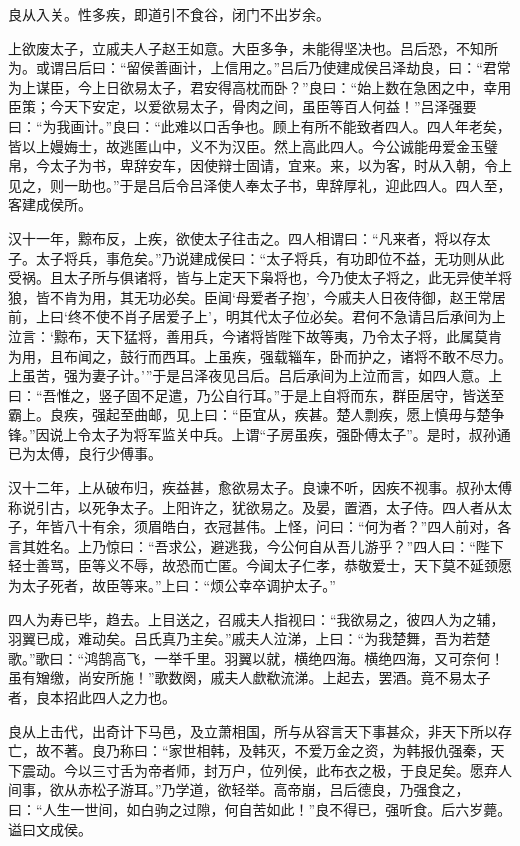 \documentclass[]{article}
\begin{document}
良从入关。性多疾，即道引不食谷，闭门不出岁余。

上欲废太子，立戚夫人子赵王如意。大臣多争，未能得坚决也。吕后恐，不知所为。或谓吕后曰：``留侯善画计，上信用之。''吕后乃使建成侯吕泽劫良，曰：``君常为上谋臣，今上日欲易太子，君安得高枕而卧？''良曰：``始上数在急困之中，幸用臣策；今天下安定，以爱欲易太子，骨肉之间，虽臣等百人何益！''吕泽强要曰：``为我画计。''良曰：``此难以口舌争也。顾上有所不能致者四人。四人年老矣，皆以上嫚娒士，故逃匿山中，义不为汉臣。然上高此四人。今公诚能毋爱金玉璧帛，今太子为书，卑辞安车，因使辩士固请，宜来。来，以为客，时从入朝，令上见之，则一助也。''于是吕后令吕泽使人奉太子书，卑辞厚礼，迎此四人。四人至，客建成侯所。

汉十一年，黥布反，上疾，欲使太子往击之。四人相谓曰：``凡来者，将以存太子。太子将兵，事危矣。''乃说建成侯曰：``太子将兵，有功即位不益，无功则从此受祸。且太子所与俱诸将，皆与上定天下枭将也，今乃使太子将之，此无异使羊将狼，皆不肯为用，其无功必矣。臣闻`母爱者子抱'，今戚夫人日夜侍御，赵王常居前，上曰`终不使不肖子居爱子上'，明其代太子位必矣。君何不急请吕后承间为上泣言：`黥布，天下猛将，善用兵，今诸将皆陛下故等夷，乃令太子将，此属莫肯为用，且布闻之，鼓行而西耳。上虽疾，强载辎车，卧而护之，诸将不敢不尽力。上虽苦，强为妻子计。'''于是吕泽夜见吕后。吕后承间为上泣而言，如四人意。上曰：``吾惟之，竖子固不足遣，乃公自行耳。''于是上自将而东，群臣居守，皆送至霸上。良疾，强起至曲邮，见上曰：``臣宜从，疾甚。楚人剽疾，愿上慎毋与楚争锋。''因说上令太子为将军监关中兵。上谓``子房虽疾，强卧傅太子''。是时，叔孙通已为太傅，良行少傅事。

汉十二年，上从破布归，疾益甚，愈欲易太子。良谏不听，因疾不视事。叔孙太傅称说引古，以死争太子。上阳许之，犹欲易之。及晏，置酒，太子侍。四人者从太子，年皆八十有余，须眉皓白，衣冠甚伟。上怪，问曰：``何为者？''四人前对，各言其姓名。上乃惊曰：``吾求公，避逃我，今公何自从吾儿游乎？''四人曰：``陛下轻士善骂，臣等义不辱，故恐而亡匿。今闻太子仁孝，恭敬爱士，天下莫不延颈愿为太子死者，故臣等来。''上曰：``烦公幸卒调护太子。''

四人为寿已毕，趋去。上目送之，召戚夫人指视曰：``我欲易之，彼四人为之辅，羽翼已成，难动矣。吕氏真乃主矣。''戚夫人泣涕，上曰：``为我楚舞，吾为若楚歌。''歌曰：``鸿鹄高飞，一举千里。羽翼以就，横绝四海。横绝四海，又可奈何！虽有矰缴，尚安所施！''歌数阕，戚夫人歔欷流涕。上起去，罢酒。竟不易太子者，良本招此四人之力也。

良从上击代，出奇计下马邑，及立萧相国，所与从容言天下事甚众，非天下所以存亡，故不著。良乃称曰：``家世相韩，及韩灭，不爱万金之资，为韩报仇强秦，天下震动。今以三寸舌为帝者师，封万户，位列侯，此布衣之极，于良足矣。愿弃人间事，欲从赤松子游耳。''乃学道，欲轻举。高帝崩，吕后德良，乃强食之，曰：``人生一世间，如白驹之过隙，何自苦如此！''良不得已，强听食。后六岁薨。谥曰文成侯。
\end{document}
